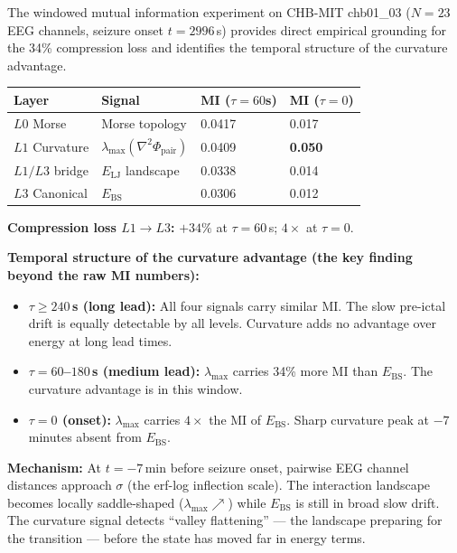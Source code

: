 \documentclass[11pt,a4paper]{article}
\theoremstyle{definition}
\begin{document}
The windowed mutual information experiment on CHB-MIT chb01\_03
($N=23$ EEG channels, seizure onset $t=2996$\,s)
provides direct empirical grounding for the 34\% compression loss
and identifies the temporal structure of the curvature advantage.

\begin{center}
\renewcommand{\arraystretch}{1.3}
\begin{tabular}{llll}
\toprule
\textbf{Layer} & \textbf{Signal} & \textbf{MI ($\tau=60$s)} & \textbf{MI ($\tau=0$)} \\
\midrule
$L0$ Morse & Morse topology & 0.0417 & 0.017 \\
$L1$ Curvature & $\lambda_\mathrm{max}(\nabla^2\Phi_\mathrm{pair})$ & 0.0409 & \textbf{0.050} \\
$L1/L3$ bridge & $E_\mathrm{LJ}$ landscape & 0.0338 & 0.014 \\
$L3$ Canonical & $E_\mathrm{BS}$ & 0.0306 & 0.012 \\
\bottomrule
\end{tabular}
\end{center}

\textbf{Compression loss $L1 \to L3$:} $+34\%$ at $\tau=60$\,s;
$4\times$ at $\tau=0$.

\textbf{Temporal structure of the curvature advantage
(the key finding beyond the raw MI numbers):}

\begin{itemize}
\item \textbf{$\tau \geq 240$\,s (long lead):} All four signals carry similar MI.
  The slow pre-ictal drift is equally detectable by all levels.
  Curvature adds no advantage over energy at long lead times.

\item \textbf{$\tau = 60$--$180$\,s (medium lead):} $\lambda_\mathrm{max}$
  carries 34\% more MI than $E_\mathrm{BS}$.
  The curvature advantage is in this window.

\item \textbf{$\tau = 0$ (onset):} $\lambda_\mathrm{max}$ carries
  $4\times$ the MI of $E_\mathrm{BS}$.
  Sharp curvature peak at $-7$ minutes absent from $E_\mathrm{BS}$.
\end{itemize}

\textbf{Mechanism:} At $t = -7$\,min before seizure onset,
pairwise EEG channel distances approach $\sigma$ (the erf-log inflection scale).
The interaction landscape becomes locally saddle-shaped
($\lambda_\mathrm{max} \nearrow$)
while $E_\mathrm{BS}$ is still in broad slow drift.
The curvature signal detects ``valley flattening'' --- the landscape
preparing for the transition --- before the state has moved far in energy terms.
\end{document}
